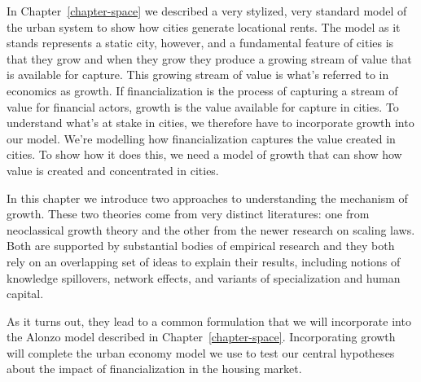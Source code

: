 In Chapter~\ref{chapter-space} we described a very stylized, very standard model of the urban system to show how cities generate locational rents.
The model as it stands represents a static city, however, and a fundamental feature of cities is that they grow and when they grow they produce a growing stream of value that is available for capture. %
%
This growing stream of value is what's referred to in economics as growth. If financialization is the process of capturing a stream of value for financial actors, growth is the value available for capture in cities. To understand what's at stake in cities, we therefore have to incorporate growth into our model. 
We're modelling how financialization captures the value created in cities. To show how it does this, we need %
 a model of growth that can show how value is created and concentrated in cities. %


In this chapter we introduce two approaches to understanding the mechanism of growth. These two theories come from very distinct literatures: one from neoclassical growth theory and the other from the newer research on scaling laws. Both are supported by substantial bodies of empirical research and they both rely on  an overlapping set of ideas to explain their results, including notions of knowledge spillovers, network effects, and variants of specialization and human capital. 

As it turns out, they lead to a common formulation that we will incorporate into the Alonzo model described in  Chapter~\ref{chapter-space}. 
Incorporating growth will complete the urban economy model we use to test our central hypotheses about the impact of financialization in the housing market.%


